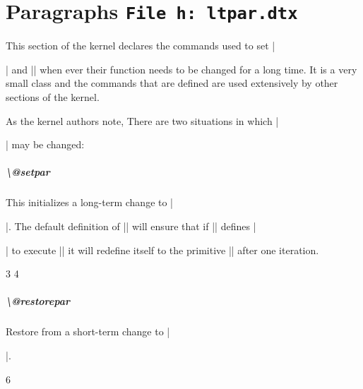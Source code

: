 \chapter{Paragraphs \texttt{File h: ltpar.dtx}}


This section of the kernel declares the commands used to set |\par| and |\everypar|
when ever their function needs to be changed for a long time. It is a very small class
and the commands that are defined are used extensively by other sections of the kernel.

As the kernel authors note, There are two situations in which |\par| may be changed:


\paragraph{\textbackslash @setpar} This initializes a long-term change to |\par|. The default definition of |\@par| will ensure that if |\@restorepar| defines |\par|
to execute |\@par| it will redefine itself to the primitive |\@@par| after one iteration.

\begin{teX}
3 \def\@setpar#1{\def\par{#1}\def\@par{#1}}
4 \def\@par{\let\par\@@par\par}
\end{teX}

\paragraph{\textbackslash @restorepar} Restore from a short-term change to |\par|.

\begin{teX}
6 \def\@restorepar{\def\par{\@par}}
\end{teX}

